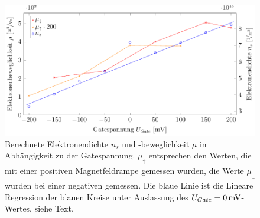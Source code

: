 \begin{figure}[h]
	\centering
	\includegraphics[scale=1]{graphs/gate/auswertung.pdf}
	\caption[Auswertung der Gatespannungsvariation]{
		Berechnete Elektronendichte $n_s$ und -beweglichkeit $\mu$ in Abhängigkeit zu der Gatespannung. $\mu_{\uparrow}$ entsprechen den Werten, die mit einer positiven Magnetfeldrampe gemessen wurden, die Werte $\mu_{\downarrow}$ wurden bei einer negativen gemessen. Die blaue Linie ist die Lineare Regression der blauen Kreise unter Auslassung des $U_{Gate}=\unit[0]{mV}$-Wertes, siehe Text.
	}
	\label{fig:gate_ausw}
\end{figure}
